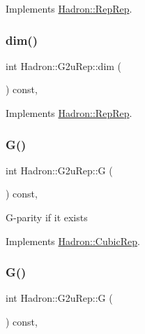Implements \mbox{\hyperlink{structHadron_1_1RepRep_a92c8802e5ed7afd7da43ccfd5b7cd92b}{Hadron\+::\+Rep\+Rep}}.

\mbox{\label{structHadron_1_1G2uRep_a1cfbf4340498e3300f5d921ed683dea8}} 
\subsubsection{\texorpdfstring{dim()}{dim()}\hspace{0.1cm}{\footnotesize\ttfamily [3/3]}}
{\footnotesize\ttfamily int Hadron\+::\+G2u\+Rep\+::dim (\begin{DoxyParamCaption}{ }\end{DoxyParamCaption}) const\hspace{0.3cm}{\ttfamily [inline]}, {\ttfamily [virtual]}}



Implements \mbox{\hyperlink{structHadron_1_1RepRep_a92c8802e5ed7afd7da43ccfd5b7cd92b}{Hadron\+::\+Rep\+Rep}}.

\mbox{\label{structHadron_1_1G2uRep_ada683c14614d17ba8a131f1b32a1777d}} 
\subsubsection{\texorpdfstring{G()}{G()}\hspace{0.1cm}{\footnotesize\ttfamily [1/2]}}
{\footnotesize\ttfamily int Hadron\+::\+G2u\+Rep\+::G (\begin{DoxyParamCaption}{ }\end{DoxyParamCaption}) const\hspace{0.3cm}{\ttfamily [inline]}, {\ttfamily [virtual]}}

G-\/parity if it exists 

Implements \mbox{\hyperlink{structHadron_1_1CubicRep_a52104e43266d1614c00bbd1c3b395458}{Hadron\+::\+Cubic\+Rep}}.

\mbox{\label{structHadron_1_1G2uRep_ada683c14614d17ba8a131f1b32a1777d}} 
\subsubsection{\texorpdfstring{G()}{G()}\hspace{0.1cm}{\footnotesize\ttfamily [2/2]}}
{\footnotesize\ttfamily int Hadron\+::\+G2u\+Rep\+::G (\begin{DoxyParamCaption}{ }\end{DoxyParamCaption}) const\hspace{0.3cm}{\ttfamily [inline]}, {\ttfamily [virtual]}}

